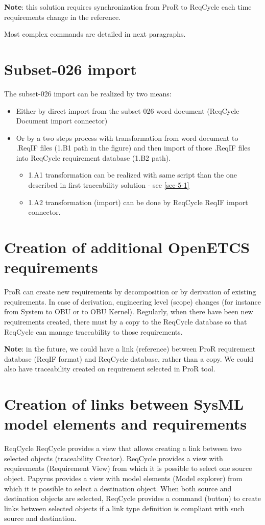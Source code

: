 \documentclass[11pt]{template/openetcs_report}
\begin{document}
\textbf{Note}: this solution requires synchronization from ProR to ReqCycle each time requirements change in the reference.
 
Most complex commands are detailed in next paragraphs.

\section{Subset-026 import}
\label{sec-6-1}
The subset-026 import can be realized by two means:
\begin{itemize}
\item Either by direct import from the subset-026 word document (ReqCycle Document import connector)
\item Or by a two steps process with transformation from word document to .ReqIF files (1.B1 path in the figure) and then import of those .ReqIF files into ReqCycle requirement database (1.B2 path).
	\begin{itemize}

	\item 1.A1 transformation can be realized with same script than the one described in first traceability solution - see \ref{sec-5-1}

	\item 1.A2 transformation (import) can be done by ReqCycle ReqIF import connector.
	\end{itemize}
\end{itemize}

\section{Creation of additional OpenETCS requirements}
\label{sec-6-2}
ProR can create new requirements by decomposition or by derivation of existing requirements.
In case of derivation, engineering level (scope) changes (for instance from System to OBU or to OBU Kernel).
Regularly, when there have been new requirements created, there must by a copy to the ReqCycle database so that ReqCycle can manage traceability to those requirements.

\textbf{Note}: in the future, we could have a link (reference) between ProR requirement database (ReqIF format) and ReqCycle database, rather than a copy. We could also have traceability created on requirement selected in ProR tool.

\section{Creation of links between SysML model elements and requirements}
\label{sec-6-3}
ReqCycle
ReqCycle provides a view that allows creating a link between two selected objects (traceability Creator).
ReqCycle provides a view with requirements (Requirement View) from which it is possible to select one source object.
Papyrus provides a view with model elements (Model explorer) from which it is possible to select a destination object.
When both source and destination objects are selected, ReqCycle provides a command (button) to create links between selected objects if a link type definition is compliant with such source and destination.
\end{document}
